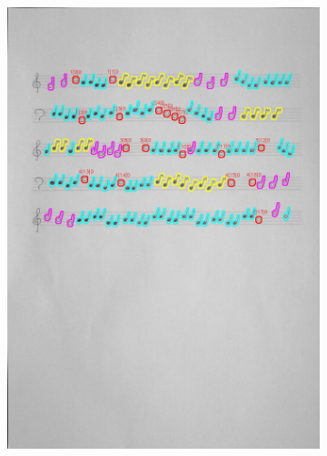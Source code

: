 \documentclass[11pt]{article}
\begin{document}
\begin{figure}[H]
    \centering
    \begin{subfigure}{.5\textwidth}
        \centering
        \graphicspath{ {blobs/} }
        \includegraphics[width=\linewidth]{4_cnts.jpg}
        \label{fig:sub1}
    \end{subfigure}%
    \begin{subfigure}{.5\textwidth}
        \centering
        \graphicspath{ {blobs/} }

\end{subfigure}
\end{figure}
\end{document}
